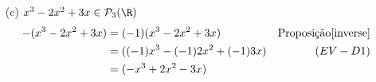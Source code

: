 \begin{itemize}
\item[(c)] $x^3 - 2x^2 + 3x \in \mathcal{P}_3( \R )$
    \begin{align*}
        -(x^3 - 2x^2 + 3x) &= (-1)(x^3 - 2x^2 + 3x) & \text{Proposição\ref{inverse}}\\
        &= ((-1)x^3 -(-1)2x^2 + (-1)3x) & (EV-D1)\\
        &= (-x^3 + 2x^2 - 3x)
    \end{align*}

\end{itemize}